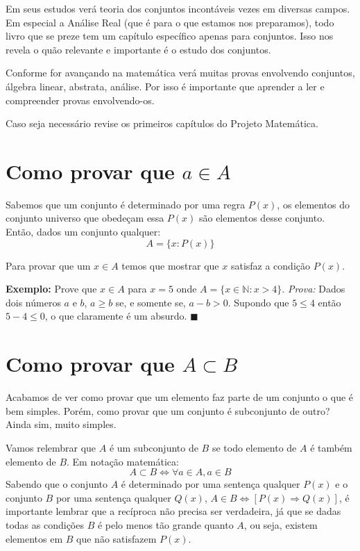 \documentclass[main.tex]{subfiles}
\begin{document}
Em seus estudos verá teoria dos conjuntos incontáveis vezes em diversas campos. Em especial a Análise Real (que é para o que estamos nos preparamos), todo livro que se preze tem um capítulo específico apenas para conjuntos. Isso nos revela o quão relevante e importante é o estudo dos conjuntos.
\par 

Conforme for avançando na matemática verá muitas provas envolvendo conjuntos, álgebra linear, abstrata, análise. Por isso é importante que aprender a ler e compreender provas envolvendo-os.
\par 

Caso seja necessário revise os primeiros capítulos do Projeto Matemática.

\section{Como provar que $ a \in A $}
Sabemos que um conjunto é determinado por uma regra $P(x)$, os elementos do conjunto universo que obedeçam essa $P(x)$ são elementos desse conjunto. Então, dados um conjunto qualquer:
$$A = \{x: P(x)\}$$

Para provar que um $x \in A$ temos que mostrar que $x$ satisfaz a condição $P(x)$.

\textbf{Exemplo:} Prove que $x \in A$ para $x = 5$ onde $A = \lbrace x \in \mathbb{N}: x > 4\rbrace$.
\textit{Prova:} Dados dois números $a$ e $b$, $a \geq b$ se, e somente se, $a - b > 0$. Supondo que $5 \leq 4$ então $5 - 4 \leq 0$, o que claramente é um absurdo. $\blacksquare$

\section{Como provar que $A \subset B$}
Acabamos de ver como provar que um elemento faz parte de um conjunto o que é bem simples. Porém, como provar que um conjunto é subconjunto de outro? Ainda sim, muito simples.
\par

Vamos relembrar que $A$ é um subconjunto de $B$ se todo elemento de $A$ é também elemento de $B$. Em notação matemática:
$$A \subset B \Leftrightarrow \forall a \in A, a \in B$$
Sabendo que o conjunto $A$ é determinado por uma sentença qualquer $P(x)$ e o conjunto $B$ por uma sentença qualquer $Q(x)$, $A \in B \Leftrightarrow [P(x) \Rightarrow Q(x)]$, é importante lembrar que a recíproca não precisa ser verdadeira, já que se dadas todas as condições $B$ é pelo menos tão grande quanto $A$, ou seja, existem elementos em $B$ que não satisfazem $P(x)$.
\\
\end{document}
